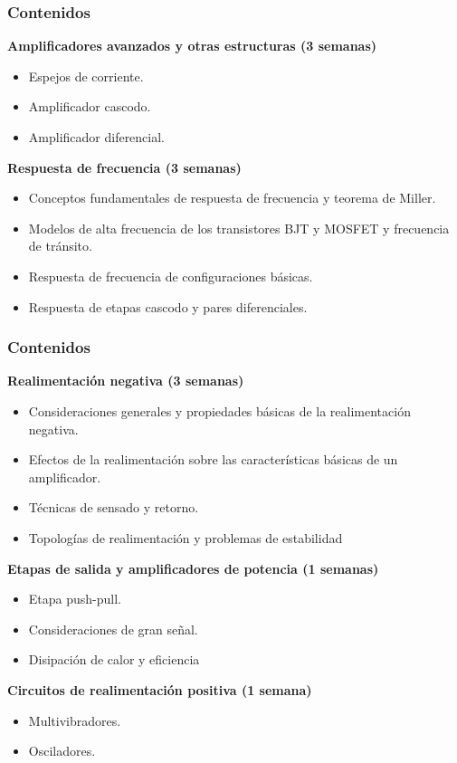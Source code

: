\begin{frame}[t]
\frametitle{Contenidos}

\textbf{Amplificadores avanzados y otras estructuras (3 semanas)}

\begin{itemize}
	\item Espejos de corriente.
	\item Amplificador cascodo.
	\item Amplificador diferencial.
\end{itemize}

\textbf{Respuesta de frecuencia (3 semanas)}

\begin{itemize}
	\item Conceptos fundamentales de respuesta de frecuencia y teorema de Miller.
	\item Modelos de alta frecuencia de los transistores BJT y MOSFET y frecuencia de tránsito.
	\item Respuesta de frecuencia de configuraciones básicas.
	\item Respuesta de etapas cascodo y pares diferenciales.	
\end{itemize}
\end{frame}

\begin{frame}[t]
\frametitle{Contenidos}

\textbf{Realimentación negativa (3 semanas)}

\begin{itemize}
	\item Consideraciones generales y propiedades básicas de la realimentación negativa.
	\item Efectos de la realimentación sobre las características básicas de un amplificador.
	\item Técnicas de sensado y retorno.
	\item Topologías de realimentación y problemas de estabilidad		
\end{itemize}

\textbf{Etapas de salida y amplificadores de potencia (1 semanas)}

\begin{itemize}
	\item Etapa push-pull.
	\item Consideraciones de gran señal.
	\item Disipación de calor y eficiencia		
\end{itemize}

\textbf{Circuitos de realimentación positiva (1 semana)}

\begin{itemize}
	\item Multivibradores.
	\item Osciladores.	
\end{itemize}

\end{frame}

